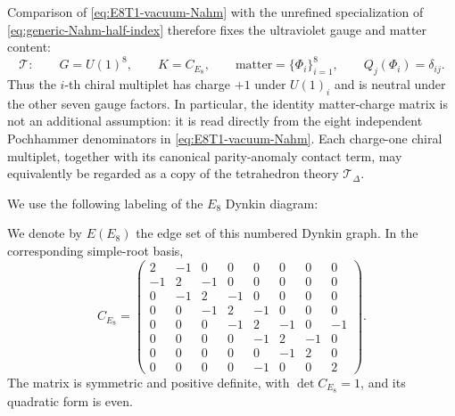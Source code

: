 \documentclass[11pt,a4paper]{article}
\numberwithin{equation}{section}
\begin{document}
Comparison of \eqref{eq:E8T1-vacuum-Nahm} with the unrefined specialization of \eqref{eq:generic-Nahm-half-index} therefore fixes the ultraviolet gauge and matter content:
\begin{equation}
  \mathcal T:\qquad
  G=U(1)^8,
  \qquad
  K=C_{E_8},
  \qquad
  \text{matter}=\{\Phi_i\}_{i=1}^{8},
  \qquad
  Q_j(\Phi_i)=\delta_{ij}.
  \label{eq:CE8-UV-theory}
\end{equation}
Thus the $i$-th chiral multiplet has charge $+1$ under $U(1)_i$ and is neutral under the other seven gauge factors.  In particular, the identity matter-charge matrix is not an additional assumption: it is read directly from the eight independent Pochhammer denominators in \eqref{eq:E8T1-vacuum-Nahm}.  Each charge-one chiral multiplet, together with its canonical parity-anomaly contact term, may equivalently be regarded as a copy of the tetrahedron theory $\mathcal T_\Delta$.

We use the following labeling of the $E_8$ Dynkin diagram:
\begin{center}
\end{center}
We denote by $E(E_8)$ the edge set of this numbered Dynkin graph.
In the corresponding simple-root basis,
\begin{equation}
C_{E_8}=
\begin{pmatrix}
2&-1&0&0&0&0&0&0\\
-1&2&-1&0&0&0&0&0\\
0&-1&2&-1&0&0&0&0\\
0&0&-1&2&-1&0&0&0\\
0&0&0&-1&2&-1&0&-1\\
0&0&0&0&-1&2&-1&0\\
0&0&0&0&0&-1&2&0\\
0&0&0&0&-1&0&0&2
\end{pmatrix}.
\label{eq:E8-Cartan}
\end{equation}
The matrix is symmetric and positive definite, with $\det C_{E_8}=1$, and its quadratic form is even.
\end{document}
